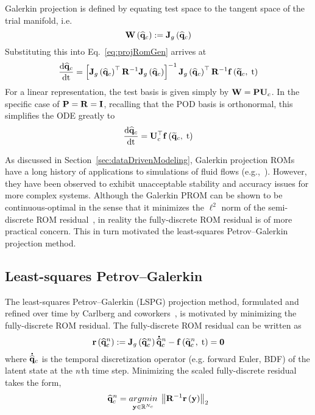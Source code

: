 Galerkin projection is defined by equating test space to the tangent space of the trial manifold, i.e.
%
\begin{equation}
    \testBasis\left(\consVecCoef\right) \defEq \jacobDecodeFunc{\consVecCoef}
\end{equation}
%
Substituting this into Eq.~\ref{eq:projRomGen} arrives at
%
\begin{equation}
    \ode{\consVecCoef}{\timeVar} = \left[\jacobDecodeFunc{\consVecCoef}^\top \resScaleInv \jacobDecodeFunc{\consVecCoef}\right]^{-1} \jacobDecodeFunc{\consVecCoef}^\top \resScaleInv \rhsFunc{\consVecRom, \; \timeVar}
\end{equation}
%
For a linear representation, the test basis is given simply by $\testBasis = \consScale \consTrial$. In the specific case of $\consScale = \resScale = \identMat$, recalling that the POD basis is orthonormal, this simplifies the ODE greatly to
%
\begin{equation}
    \ode{\consVecCoef}{\timeVar} = \consTrial^\top \rhsFunc{\consVecRom, \; \timeVar}
\end{equation} 

As discussed in Section~\ref{sec:dataDrivenModeling}, Galerkin projection ROMs have a long history of applications to simulations of fluid flows (e.g.,~\cite{Aubry1988,Cazemier1998,BuiThanh2007}). However, they have been observed to exhibit unacceptable stability and accuracy issues for more complex systems. Although the Galerkin PROM can be shown to be continuous-optimal in the sense that it minimizes the $\ell^2$ norm of the semi-discrete ROM residual~\cite{Carlberg2017}, in reality the fully-discrete ROM residual is of more practical concern. This in turn motivated the least-squares Petrov--Galerkin projection method.

\subsection{Least-squares Petrov--Galerkin}

The least-squares Petrov--Galerkin (LSPG) projection method, formulated and refined over time by Carlberg and coworkers~\cite{Carlberg2010,Carlberg2013,Carlberg2017}, is motivated by minimizing the fully-discrete ROM residual. The fully-discrete ROM residual can be written as
%
\begin{equation}
    \mathbf{r}\left(\mathbf{\widehat{q}}_{c}^{n}\right) := \mathbf{J}_{g} \left(\mathbf{\widehat{q}}_{c}^{n}\right) \accentset{\mbox{\large\bfseries .}}{\mathbf{\widehat{q}}}_c^{n} - \mathbf{f} \left(\mathbf{\widetilde{q}}_c^{n}, \; \text{t}\right) = \mathbf{0}
\end{equation}
%
where $\accentset{\mbox{\large\bfseries .}}{\mathbf{\widehat{q}}}_c$ is the temporal discretization operator (e.g. forward Euler, BDF) of the latent state at the $n$th time step. Minimizing the scaled fully-discrete residual takes the form,
%
\begin{equation}
    \consVecCoef^{\timeIdx} = \argmin{\dummyVec \inROne{\numConsModes}} \left\Vert \resScaleInv \resFunc{\dummyVec} \right\Vert_2
\end{equation}
%

